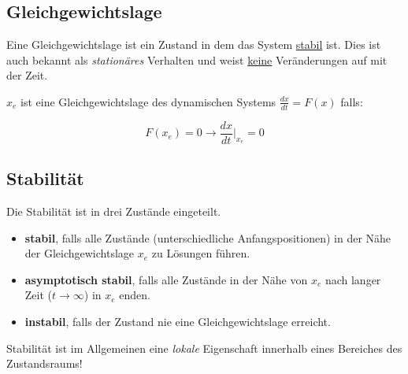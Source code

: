 \documentclass[
  10pt,
  a4paper,
]{article}
\providecommand{\tightlist}{%
  \setlength{\itemsep}{0pt}\setlength{\parskip}{0pt}}\usepackage{longtable,booktabs,array}
\numberwithin{equation}{section}
\begin{document}
\begin{multicols}{2}
\begin{tcolorbox}
\end{tcolorbox}

\hypertarget{gleichgewichtslage}{%
\subsection{Gleichgewichtslage}\label{gleichgewichtslage}}

Eine Gleichgewichtslage ist ein Zustand in dem das System \ul{stabil}
ist. Dies ist auch bekannt als \emph{stationäres} Verhalten und weist
\ul{keine} Veränderungen auf mit der Zeit.

\(x_e\) ist eine Gleichgewichtslage des dynamischen Systems
\(\frac{dx}{dt}=F(x)\) falls:

\[
F(x_e)=0 \rightarrow \frac{dx}{dt}\biggr\rvert_{x_e}=0
\]

\hypertarget{stabilituxe4t-1}{%
\subsection{Stabilität}\label{stabilituxe4t-1}}

\begin{tcolorbox}[enhanced jigsaw, coltitle=black, arc=.35mm, breakable, opacityback=0, opacitybacktitle=0.6, rightrule=.15mm, titlerule=0mm, bottomrule=.15mm, leftrule=.75mm, bottomtitle=1mm, colframe=quarto-callout-note-color-frame, toprule=.15mm, colbacktitle=quarto-callout-note-color!10!white, toptitle=1mm, title=\textcolor{quarto-callout-note-color}{\faInfo}\hspace{0.5em}{Stabilität (allgemein)}, left=2mm, colback=white]

Die Stabilität ist in drei Zustände eingeteilt.

\begin{itemize}
\tightlist
\item
  \textbf{stabil}, falls alle Zustände (unterschiedliche
  Anfangspositionen) in der Nähe der Gleichgewichtslage \(x_e\) zu
  Lösungen führen.
\item
  \textbf{asymptotisch stabil}, falls alle Zustände in der Nähe von
  \(x_e\) nach langer Zeit (\(t \rightarrow \infty\)) in \(x_e\) enden.
\item
  \textbf{instabil}, falls der Zustand nie eine Gleichgewichtslage
  erreicht.
\end{itemize}

Stabilität ist im Allgemeinen eine \emph{lokale} Eigenschaft innerhalb
eines Bereiches des Zustandsraums!

\end{tcolorbox}


\end{multicols}
\end{document}
